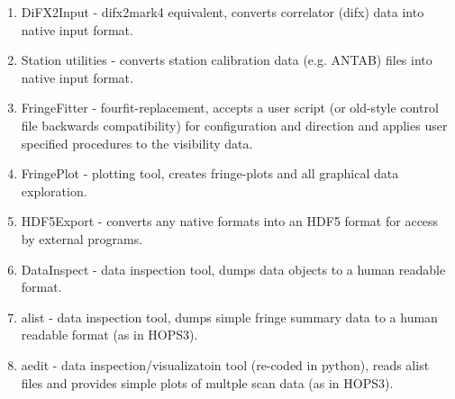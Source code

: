 \documentclass[hidelinks]{article}
\begin{document}
\begin{enumerate}
 \item DiFX2Input  - difx2mark4 equivalent, converts correlator (difx) data into native input format.
 \item Station utilities  - converts station calibration data (e.g. ANTAB) files into native input format.
 \item FringeFitter - fourfit-replacement, accepts a user script (or old-style control file backwards compatibility) for configuration and direction and applies user specified procedures to the visibility data.
 \item FringePlot  - plotting tool, creates fringe-plots and all graphical data exploration.
 \item HDF5Export  - converts any native formats into an HDF5 format for access by external programs.
 \item DataInspect - data inspection tool, dumps data objects to a human readable format.
 \item alist - data inspection tool, dumps simple fringe summary data to a human readable format (as in HOPS3).
 \item aedit - data inspection/visualizatoin tool (re-coded in python), reads alist files and provides simple plots of multple scan data (as in HOPS3).
 \end{enumerate}

 

%
%
\newpage
\addtocounter{section}{1}
\renewcommand{\refname}{\thesection. References}
%
\end{document}
